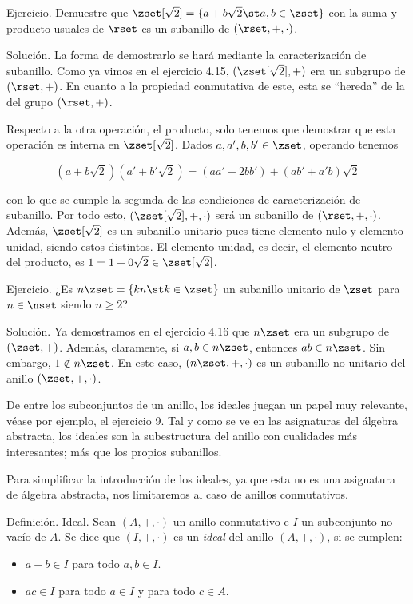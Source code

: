 Ejercicio. Demuestre que $\zset[\sqrt{2}] = \{a + b\sqrt{2} \st a, b \in
\zset\}$ con la suma y producto usuales de $\rset$ es un subanillo de
$(\rset, +, \cdot)$.

Solución. La forma de demostrarlo se hará mediante la caracterización de
subanillo. Como ya vimos en el ejercicio 4.15, $(\zset[\sqrt{2}], +)$ era un
subgrupo de $(\rset, +)$. En cuanto a la propiedad conmutativa de este, esta
se ``hereda'' de la del grupo $(\rset, +)$.

Respecto a la otra operación, el producto, solo tenemos que demostrar que
esta operación es interna en $\zset[\sqrt{2}]$. Dados $a, a', b, b' \in
\zset$, operando tenemos

$$ (a + b\sqrt{2})(a' + b'\sqrt{2}) = (aa' + 2bb') + (ab' + a'b)\sqrt{2} $$

\noindent con lo que se cumple la segunda de las condiciones de
caracterización de subanillo. Por todo esto, $(\zset[\sqrt{2}], +, \cdot)$
será un subanillo de $(\rset, +, \cdot)$. Además, $\zset[\sqrt{2}]$ es un
subanillo unitario pues tiene elemento nulo y elemento unidad, siendo estos
distintos. El elemento unidad, es decir, el elemento neutro del producto, es
$1 = 1 + 0\sqrt{2} \in \zset[\sqrt{2}]$.

Ejercicio. ¿Es $n\zset = \{kn \st k \in \zset\}$ un subanillo unitario de
$\zset$ para $n \in \nset$ siendo $n \geq 2$?

Solución. Ya demostramos en el ejercicio 4.16 que $n\zset$ era un subgrupo
de $(\zset, +)$. Además, claramente, si $a, b \in n\zset$, entonces $ab \in
n\zset$. Sin embargo, $1 \notin n\zset$. En este caso, $(n\zset, +, \cdot)$
es un subanillo no unitario del anillo $(\zset, +, \cdot)$.

De entre los subconjuntos de un anillo, los ideales juegan un papel muy
relevante, véase por ejemplo, el ejercicio 9. Tal y como se ve en las
asignaturas del álgebra abstracta, los ideales son la subestructura del
anillo con cualidades más interesantes; más que los propios subanillos.

Para simplificar la introducción de los ideales, ya que esta no es una
asignatura de álgebra abstracta, nos limitaremos al caso de anillos
conmutativos.

Definición. Ideal. Sean $(A, +, \cdot)$ un anillo conmutativo e $I$ un
subconjunto no vacío de $A$. Se dice que $(I, +, \cdot)$ es un \emph{ideal}
del anillo $(A, +, \cdot)$, si se cumplen:

\begin{itemize}
  \item $a - b \in I$ para todo $a, b \in I$.
  \item $ac \in I$ para todo $a \in I$ y para todo $c \in A$.
\end{itemize}


